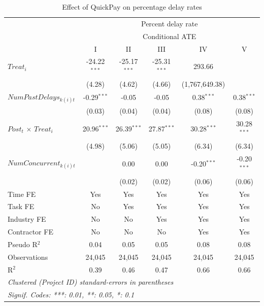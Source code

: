 \documentclass[
]{article}
\begin{document}
\begin{table}[htbp]
   \caption{Effect of QuickPay on percentage delay rates}
   \centering
   \small
   \begin{tabular}{lccccc}
      \toprule
       & \multicolumn{5}{c}{Percent delay rate}\\
       & \multicolumn{5}{c}{Conditional ATE} \\ 
                                   & I              & II             & III            & IV             & V\\  
      \midrule 
      $Treat_i$                    & -24.22$^{***}$ & -25.17$^{***}$ & -25.31$^{***}$ & 293.66         &   \\   
                                   & (4.28)         & (4.62)         & (4.66)         & (1,767,649.38) &   \\   
      $NumPastDelays_{k(i)t}$      & -0.29$^{***}$  & -0.05          & -0.05          & 0.38$^{***}$   & 0.38$^{***}$\\   
                                   & (0.03)         & (0.04)         & (0.04)         & (0.08)         & (0.08)\\   
      $Post_t$ $\times$ $Treat_i$  & 20.96$^{***}$  & 26.39$^{***}$  & 27.87$^{***}$  & 30.28$^{***}$  & 30.28$^{***}$\\   
                                   & (4.98)         & (5.06)         & (5.05)         & (6.34)         & (6.34)\\   
      $NumConcurrent_{k(i)t}$      &                & 0.00           & 0.00           & -0.20$^{***}$  & -0.20$^{***}$\\   
                                   &                & (0.02)         & (0.02)         & (0.06)         & (0.06)\\   
      \midrule 
      Time FE                      & Yes            & Yes            & Yes            & Yes            & Yes\\  
      Task FE                      & No             & Yes            & Yes            & Yes            & Yes\\  
      Industry FE                  & No             & No             & Yes            & Yes            & Yes\\  
      Contractor FE                & No             & No             & No             & Yes            & Yes\\  
      Pseudo R$^2$                 & 0.04           & 0.05           & 0.05           & 0.08           & 0.08\\  
      Observations                 & 24,045         & 24,045         & 24,045         & 24,045         & 24,045\\  
      R$^2$                        & 0.39           & 0.46           & 0.47           & 0.66           & 0.66\\  
      \midrule
      \multicolumn{6}{l}{\emph{Clustered (Project ID) standard-errors in parentheses}}\\
      \multicolumn{6}{l}{\emph{Signif. Codes: ***: 0.01, **: 0.05, *: 0.1}}\\
   \end{tabular}
   

\end{table}
\end{document}

